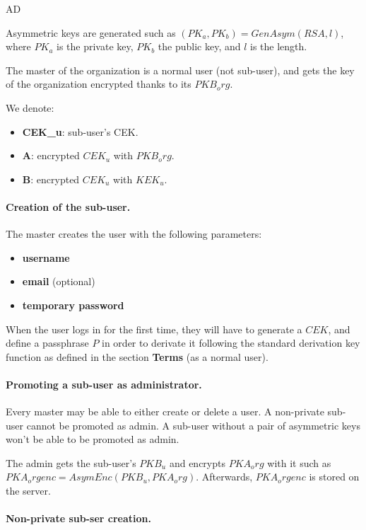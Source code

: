 AD\documentclass[a4paper,10pt]{article}
\begin{document}
Asymmetric keys are generated such as $(PK_a, PK_b)=GenAsym(RSA, l)$,
where $PK_a$ is the private key, $PK_b$ the public key, and $l$ is the length.

The master of the organization is a normal user (not sub-user), and gets the
key of the organization encrypted thanks to its $PKB_org$.

We denote:

\begin{itemize}
	\item \textbf{CEK_u}: sub-user's CEK.
	\item \textbf{A}: encrypted $CEK_u$ with $PKB_org$.
	\item \textbf{B}: encrypted $CEK_u$ with $KEK_u$.
\end{itemize}

\paragraph{Creation of the sub-user.}

The master creates the user with the following parameters:

\begin{itemize}
	\item \textbf{username}
	\item \textbf{email} (optional)
	\item \textbf{temporary password}
\end{itemize}

When the user logs in for the first time, they will have to generate a $CEK$,
and define a passphrase $P$ in order to derivate it following the standard
derivation key function as defined in the section \textbf{Terms} (as a normal
user).

\paragraph{Promoting a sub-user as administrator.}

Every master may be able to either create or delete a user. A non-private
sub-user cannot be promoted as admin. A sub-user without a pair of asymmetric
keys won't be able to be promoted as admin.

The admin gets the sub-user's $PKB_u$ and encrypts $PKA_org$ with it such as
$PKA_orgenc=AsymEnc(PKB_u,PKA_org)$. Afterwards, $PKA_orgenc$ is stored on
the server.

\paragraph{Non-private sub-ser creation.}
\end{document}
